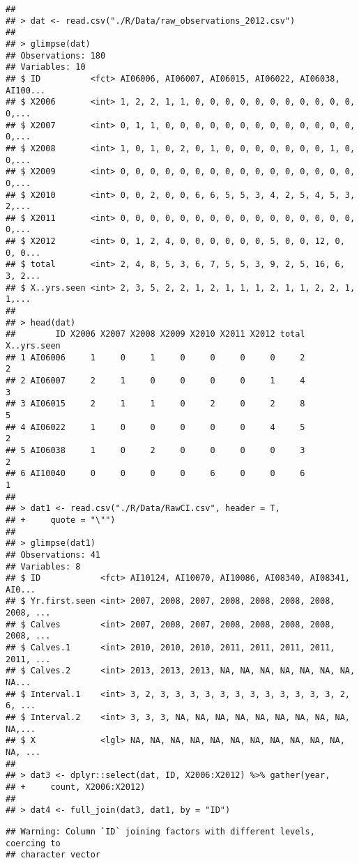 \documentclass[]{book}
\begin{document}
\begin{verbatim}
## 
## > dat <- read.csv("./R/Data/raw_observations_2012.csv")
## 
## > glimpse(dat)
## Observations: 180
## Variables: 10
## $ ID          <fct> AI06006, AI06007, AI06015, AI06022, AI06038, AI100...
## $ X2006       <int> 1, 2, 2, 1, 1, 0, 0, 0, 0, 0, 0, 0, 0, 0, 0, 0, 0,...
## $ X2007       <int> 0, 1, 1, 0, 0, 0, 0, 0, 0, 0, 0, 0, 0, 0, 0, 0, 0,...
## $ X2008       <int> 1, 0, 1, 0, 2, 0, 1, 0, 0, 0, 0, 0, 0, 0, 1, 0, 0,...
## $ X2009       <int> 0, 0, 0, 0, 0, 0, 0, 0, 0, 0, 0, 0, 0, 0, 0, 0, 0,...
## $ X2010       <int> 0, 0, 2, 0, 0, 6, 6, 5, 5, 3, 4, 2, 5, 4, 5, 3, 2,...
## $ X2011       <int> 0, 0, 0, 0, 0, 0, 0, 0, 0, 0, 0, 0, 0, 0, 0, 0, 0,...
## $ X2012       <int> 0, 1, 2, 4, 0, 0, 0, 0, 0, 0, 5, 0, 0, 12, 0, 0, 0...
## $ total       <int> 2, 4, 8, 5, 3, 6, 7, 5, 5, 3, 9, 2, 5, 16, 6, 3, 2...
## $ X..yrs.seen <int> 2, 3, 5, 2, 2, 1, 2, 1, 1, 1, 2, 1, 1, 2, 2, 1, 1,...
## 
## > head(dat)
##        ID X2006 X2007 X2008 X2009 X2010 X2011 X2012 total X..yrs.seen
## 1 AI06006     1     0     1     0     0     0     0     2           2
## 2 AI06007     2     1     0     0     0     0     1     4           3
## 3 AI06015     2     1     1     0     2     0     2     8           5
## 4 AI06022     1     0     0     0     0     0     4     5           2
## 5 AI06038     1     0     2     0     0     0     0     3           2
## 6 AI10040     0     0     0     0     6     0     0     6           1
## 
## > dat1 <- read.csv("./R/Data/RawCI.csv", header = T, 
## +     quote = "\"")
## 
## > glimpse(dat1)
## Observations: 41
## Variables: 8
## $ ID            <fct> AI10124, AI10070, AI10086, AI08340, AI08341, AI0...
## $ Yr.first.seen <int> 2007, 2008, 2007, 2008, 2008, 2008, 2008, 2008, ...
## $ Calves        <int> 2007, 2008, 2007, 2008, 2008, 2008, 2008, 2008, ...
## $ Calves.1      <int> 2010, 2010, 2010, 2011, 2011, 2011, 2011, 2011, ...
## $ Calves.2      <int> 2013, 2013, 2013, NA, NA, NA, NA, NA, NA, NA, NA...
## $ Interval.1    <int> 3, 2, 3, 3, 3, 3, 3, 3, 3, 3, 3, 3, 3, 3, 2, 6, ...
## $ Interval.2    <int> 3, 3, 3, NA, NA, NA, NA, NA, NA, NA, NA, NA, NA,...
## $ X             <lgl> NA, NA, NA, NA, NA, NA, NA, NA, NA, NA, NA, NA, ...
## 
## > dat3 <- dplyr::select(dat, ID, X2006:X2012) %>% gather(year, 
## +     count, X2006:X2012)
## 
## > dat4 <- full_join(dat3, dat1, by = "ID")
\end{verbatim}

\begin{verbatim}
## Warning: Column `ID` joining factors with different levels, coercing to
## character vector
\end{verbatim}
\end{document}
